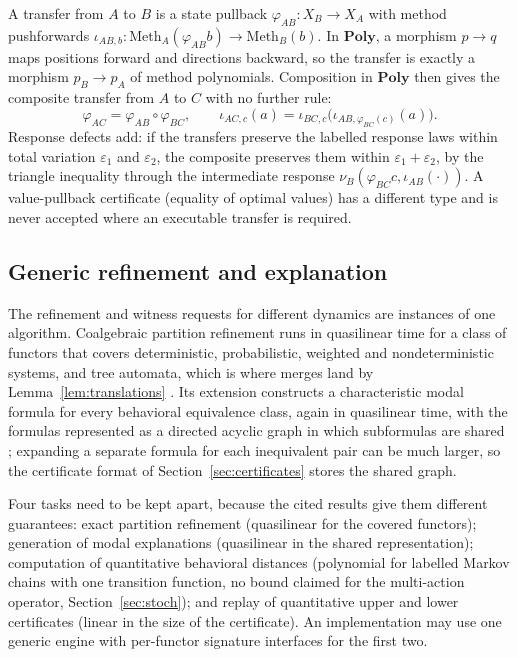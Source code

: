 \documentclass[11pt]{article}
\newcommand{\Poly}{\mathbf{Poly}}
\theoremstyle{definition}
\theoremstyle{plain}
\begin{document}
A transfer from $A$ to $B$ is a state pullback $\varphi_{AB}:X_B\to X_A$ with method pushforwards
$\iota_{AB,b}:\mathrm{Meth}_A(\varphi_{AB}b)\to\mathrm{Meth}_B(b)$. In $\Poly$, a morphism
$p\to q$ maps positions forward and directions backward, so the transfer is exactly a morphism
$p_B\to p_A$ of method polynomials. Composition in $\Poly$ then gives the composite transfer
from $A$ to $C$ with no further rule:
\[
\varphi_{AC}=\varphi_{AB}\circ\varphi_{BC},\qquad
\iota_{AC,c}(a)=\iota_{BC,c}\bigl(\iota_{AB,\varphi_{BC}(c)}(a)\bigr).
\]
Response defects add: if the transfers preserve the labelled response laws within total
variation $\varepsilon_1$ and $\varepsilon_2$, the composite preserves them within
$\varepsilon_1+\varepsilon_2$, by the triangle inequality through the intermediate response
$\nu_B(\varphi_{BC}c,\iota_{AB}(\cdot))$. A value-pullback certificate (equality of optimal values)
has a different type and is never accepted where an executable transfer is required.

\subsection{Generic refinement and explanation}

The refinement and witness requests for different dynamics are instances of one algorithm.
Coalgebraic partition refinement runs in quasilinear time for a class of functors that covers
deterministic, probabilistic, weighted and nondeterministic systems, and tree automata, which is
where merges land by Lemma~\ref{lem:translations} \cite{copar,copar2}. Its extension constructs a
characteristic modal formula for every behavioral equivalence class, again in quasilinear time,
with the formulas represented as a directed acyclic graph in which subformulas are shared
\cite{explaining}; expanding a separate formula for each inequivalent pair can be much larger, so
the certificate format of Section~\ref{sec:certificates} stores the shared graph.

Four tasks need to be kept apart, because the cited results give them different guarantees: exact
partition refinement (quasilinear for the covered functors); generation of modal explanations
(quasilinear in the shared representation); computation of quantitative behavioral distances
(polynomial for labelled Markov chains with one transition function, no bound claimed for the
multi-action operator, Section~\ref{sec:stoch}); and replay of quantitative upper and lower
certificates (linear in the size of the certificate). An implementation may use one generic engine
with per-functor signature interfaces for the first two.
\end{document}

